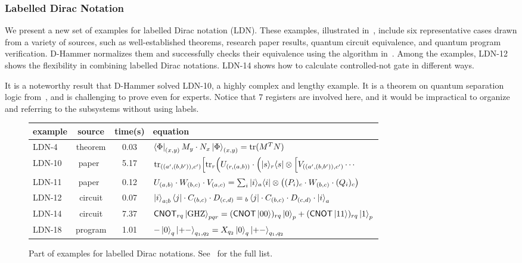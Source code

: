 \subsubsection{Labelled Dirac Notation}
We present a new set of examples for labelled Dirac notation (LDN). These examples, illustrated in~, include six representative cases drawn from a variety of sources, such as well-established theorems, research paper results, quantum circuit equivalence, and quantum program verification.
D-Hammer normalizes them and successfully checks their equivalence using the algorithm in~.
Among the examples, LDN-12 shows the flexibility in combining labelled Dirac notations.
LDN-14 shows how to calculate controlled-not gate in different ways. 

It is a noteworthy result that D-Hammer solved LDN-10, a highly complex and lengthy example. It is a theorem on quantum separation logic from~\cite{DBLP:conf/lics/ZhouBHYY21}, and is challenging to prove even for experts. Notice that 7 registers are involved here, and it would be impractical to organize and referring to the subsystems without using labels.

\begin{figure}[h]
    \center
    \setlength{\extrarowheight}{2pt}
    \begin{tabular}{l c c l}
        \hline
        example & source & time(s) & equation \\
        \hline
        LDN-4 & theorem & 0.03 & \( \bra{\Phi}_{(x, y)} M_y \cdot N_x \ket{\Phi}_{(x, y)} = \mathrm{tr}(M^T N) \) \\
        LDN-10 & paper~\cite{DBLP:conf/lics/ZhouBHYY21} & 5.17 & \( \mathrm{tr}_{((a',(b,b')),c')}\Big[\mathrm{tr}_{r}\Big(U_{(r,(a,b))} \cdot\Big(|s\rangle_r\langle s|\otimes 
        \Big[V_{((a',(b,b')),c')} \cdots \)\\
        LDN-11 & paper~\cite{PALSBERG2024206} & 0.12 & \( U_{(a,b)}\cdot W_{(b,c)}\cdot V_{(a,c)} = 
        \sum_i |i\rangle_a\langle i|\otimes \big((P_i)_c\cdot W_{(b,c)}\cdot (Q_i)_c\big)\) \\
        LDN-12 & circuit & 0.07 & \( \ket{i}_{a;b}\bra{j} \cdot C_{(b,c)} \cdot D_{(c,d)} = {}_b\bra{j} \cdot C_{(b,c)} \cdot D_{(c,d)} \cdot \ket{i}_{a}\) \\
        LDN-14 & circuit & 7.37 & \scriptsize{\( \textsf{CNOT}_{rq}\ket{\textrm{GHZ}}_{pqr} = (\textsf{CNOT}\ket{00})_{rq}\ket{0}_p + (\textsf{CNOT}\ket{11})_{rq}\ket{1}_p \)} \\
        LDN-18 & program & 1.01 & \( -\ket{0}_q\ket{+-}_{q_1, q_2} = X_{q_2} \ket{0}_q\ket{+-}_{q_1, q_2} \) \\
        \hline
    \end{tabular}
    \caption{Part of examples for labelled Dirac notations. See~ for the full list.}
    \label{fig: labelled examples}
\end{figure}